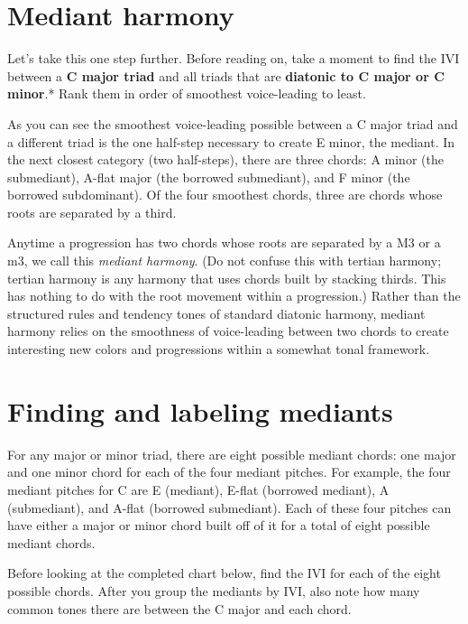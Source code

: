 \documentclass{book}
\begin{document}
\hypertarget{mediant-harmony}{%
\section{Mediant harmony}\label{mediant-harmony}}

Let's take this one step further. Before reading on, take a moment to find the
IVI between a \textbf{C major triad} and all triads that are \textbf{diatonic
to C major or C minor}.* Rank them in order of smoothest voice-leading to
least.

As you can see the smoothest voice-leading possible between a C major triad
and a different triad is the one half-step necessary to create E minor, the
mediant. In the next closest category (two half-steps), there are three
chords: A minor (the submediant), A-flat major (the borrowed submediant), and
F minor (the borrowed subdominant). Of the four smoothest chords, three are
chords whose roots are separated by a third.

Anytime a progression has two chords whose roots are separated by a M3 or a
m3, we call this \emph{mediant harmony}. (Do not confuse this with tertian
harmony; tertian harmony is any harmony that uses chords built by stacking
thirds. This has nothing to do with the root movement within a progression.)
Rather than the structured rules and tendency tones of standard diatonic
harmony, mediant harmony relies on the smoothness of voice-leading between two
chords to create interesting new colors and progressions within a somewhat
tonal framework.

\hypertarget{finding-and-labeling-mediants}{%
\section{Finding and labeling mediants}\label{finding-and-labeling-mediants}}

For any major or minor triad, there are eight possible mediant chords: one
major and one minor chord for each of the four mediant pitches. For example,
the four mediant pitches for C are E (mediant), E-flat (borrowed mediant), A
(submediant), and A-flat (borrowed submediant). Each of these four pitches can
have either a major or minor chord built off of it for a total of eight
possible mediant chords.

Before looking at the completed chart below, find the IVI for each of the
eight possible chords. After you group the mediants by IVI, also note how many
common tones there are between the C major and each chord.
\end{document}
